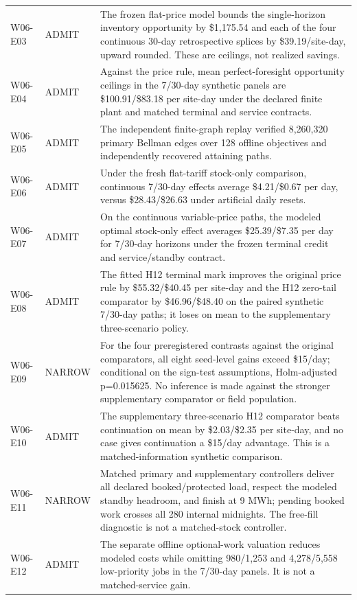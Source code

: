 \documentclass[11pt,letterpaper]{article}
\begin{document}
\begin{longtable}{P{.12\linewidth}P{.12\linewidth}P{.66\linewidth}}
W06-E03 & ADMIT & The frozen flat-price model bounds the single-horizon inventory opportunity by \$1,175.54 and each of the four continuous 30-day retrospective splices by \$39.19/site-day, upward rounded. These are ceilings, not realized savings.\\
W06-E04 & ADMIT & Against the price rule, mean perfect-foresight opportunity ceilings in the 7/30-day synthetic panels are \$100.91/\$83.18 per site-day under the declared finite plant and matched terminal and service contracts.\\
W06-E05 & ADMIT & The independent finite-graph replay verified 8,260,320 primary Bellman edges over 128 offline objectives and independently recovered attaining paths.\\
W06-E06 & ADMIT & Under the fresh flat-tariff stock-only comparison, continuous 7/30-day effects average \$4.21/\$0.67 per day, versus \$28.43/\$26.63 under artificial daily resets.\\
W06-E07 & ADMIT & On the continuous variable-price paths, the modeled optimal stock-only effect averages \$25.39/\$7.35 per day for 7/30-day horizons under the frozen terminal credit and service/standby contract.\\
W06-E08 & ADMIT & The fitted H12 terminal mark improves the original price rule by \$55.32/\$40.45 per site-day and the H12 zero-tail comparator by \$46.96/\$48.40 on the paired synthetic 7/30-day paths; it loses on mean to the supplementary three-scenario policy.\\
W06-E09 & NARROW & For the four preregistered contrasts against the original comparators, all eight seed-level gains exceed \$15/day; conditional on the sign-test assumptions, Holm-adjusted p=0.015625. No inference is made against the stronger supplementary comparator or field population.\\
W06-E10 & ADMIT & The supplementary three-scenario H12 comparator beats continuation on mean by \$2.03/\$2.35 per site-day, and no case gives continuation a \$15/day advantage. This is a matched-information synthetic comparison.\\
W06-E11 & NARROW & Matched primary and supplementary controllers deliver all declared booked/protected load, respect the modeled standby headroom, and finish at 9 MWh; pending booked work crosses all 280 internal midnights. The free-fill diagnostic is not a matched-stock controller.\\
W06-E12 & ADMIT & The separate offline optional-work valuation reduces modeled costs while omitting 980/1,253 and 4,278/5,558 low-priority jobs in the 7/30-day panels. It is not a matched-service gain.\\

\end{longtable}
\end{document}
